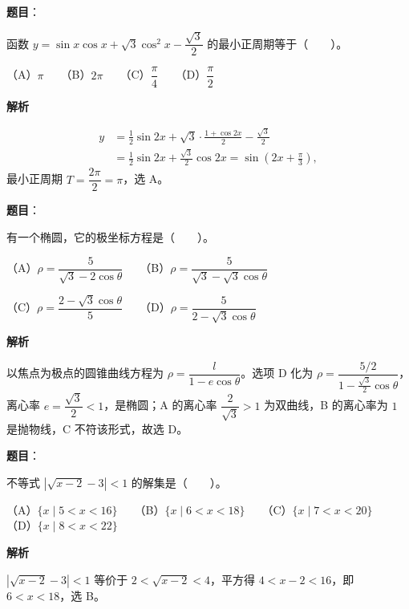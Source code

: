 \begin{answer}

\textbf{题目}：

函数 $y=\sin x\cos x+\sqrt3\cos^2x-\dfrac{\sqrt3}{2}$ 的最小正周期等于\mbox{（　　）}。

（A）$\pi$　　（B）$2\pi$　　（C）$\dfrac\pi4$　　（D）$\dfrac\pi2$

\textbf{解析}

\nopagebreak[4]
\[
\begin{aligned}
y&=\frac12\sin2x+\sqrt3\cdot\frac{1+\cos2x}{2}-\frac{\sqrt3}{2} \\
&=\frac12\sin2x+\frac{\sqrt3}{2}\cos2x=\sin\left(2x+\frac{\pi}{3}\right),
\end{aligned}
\]
最小正周期 $T=\dfrac{2\pi}{2}=\pi$，选 A。


\end{answer}
\begin{answer}

\textbf{题目}：

有一个椭圆，它的极坐标方程是\mbox{（　　）}。

（A）$\rho=\dfrac5{\sqrt3-2\cos\theta}$　　（B）$\rho=\dfrac5{\sqrt3-\sqrt3\cos\theta}$

（C）$\rho=\dfrac{2-\sqrt3\cos\theta}{5}$　　（D）$\rho=\dfrac5{2-\sqrt3\cos\theta}$

\textbf{解析}

以焦点为极点的圆锥曲线方程为 $\rho=\dfrac{l}{1-e\cos\theta}$。选项 D 化为 $\rho=\dfrac{5/2}{1-\frac{\sqrt3}{2}\cos\theta}$，离心率 $e=\dfrac{\sqrt3}{2}<1$，是椭圆；A 的离心率 $\dfrac{2}{\sqrt3}>1$ 为双曲线，B 的离心率为 $1$ 是抛物线，C 不符该形式，故选 D。


\end{answer}
\begin{answer}

\textbf{题目}：

不等式 $\left|\sqrt{x-2}-3\right|<1$ 的解集是\mbox{（　　）}。

（A）$\{x\mid 5<x<16\}$　　（B）$\{x\mid 6<x<18\}$　　（C）$\{x\mid 7<x<20\}$　　（D）$\{x\mid 8<x<22\}$

\textbf{解析}

$\left|\sqrt{x-2}-3\right|<1$ 等价于 $2<\sqrt{x-2}<4$，平方得 $4<x-2<16$，即 $6<x<18$，选 B。


\end{answer}
